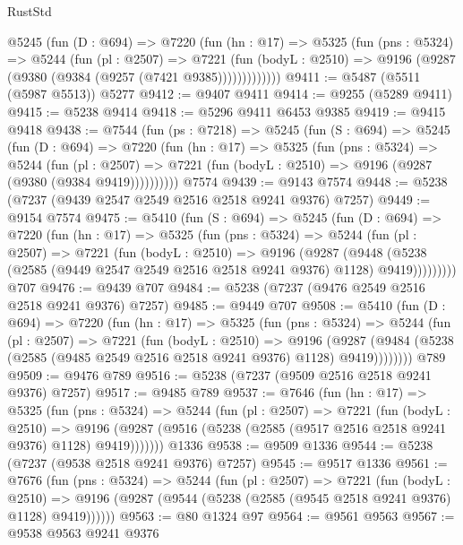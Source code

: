\begin{lexlean}{RustStd}
\begin{coremodule}
        @5245
          (fun (D : @694) =>
          @7220
            (fun (hn : @17) =>
            @5325
              (fun (pns : @5324) =>
              @5244
                (fun (pl : @2507) =>
                @7221
                  (fun (bodyL : @2510) =>
                  @9196 (@9287 (@9380 (@9384 (@9257 (@7421 @9385)))))))))))))
@9411 := @5487 (@5511 (@5987 @5513)) @5277
@9412 := @9407 @9411
@9414 := @9255 (@5289 @9411)
@9415 := @5238 @9414
@9418 := @5296 @9411 @6453 @9385
@9419 := @9415 @9418
@9438 := @7544
    (fun (ps : @7218) =>
    @5245
      (fun (S : @694) =>
      @5245
        (fun (D : @694) =>
        @7220
          (fun (hn : @17) =>
          @5325
            (fun (pns : @5324) =>
            @5244
              (fun (pl : @2507) =>
              @7221 (fun (bodyL : @2510) => @9196 (@9287 (@9380 (@9384 @9419))))))))))
    @7574
@9439 := @9143 @7574
@9448 := @5238 (@7237 (@9439 @2547 @2549 @2516 @2518 @9241 @9376) @7257)
@9449 := @9154 @7574
@9475 := @5410
    (fun (S : @694) =>
    @5245
      (fun (D : @694) =>
      @7220
        (fun (hn : @17) =>
        @5325
          (fun (pns : @5324) =>
          @5244
            (fun (pl : @2507) =>
            @7221
              (fun (bodyL : @2510) =>
              @9196
                (@9287
                  (@9448
                    (@5238 (@2585 (@9449 @2547 @2549 @2516 @2518 @9241 @9376) @1128) @9419)))))))))
    @707
@9476 := @9439 @707
@9484 := @5238 (@7237 (@9476 @2549 @2516 @2518 @9241 @9376) @7257)
@9485 := @9449 @707
@9508 := @5410
    (fun (D : @694) =>
    @7220
      (fun (hn : @17) =>
      @5325
        (fun (pns : @5324) =>
        @5244
          (fun (pl : @2507) =>
          @7221
            (fun (bodyL : @2510) =>
            @9196
              (@9287 (@9484 (@5238 (@2585 (@9485 @2549 @2516 @2518 @9241 @9376) @1128) @9419))))))))
    @789
@9509 := @9476 @789
@9516 := @5238 (@7237 (@9509 @2516 @2518 @9241 @9376) @7257)
@9517 := @9485 @789
@9537 := @7646
    (fun (hn : @17) =>
    @5325
      (fun (pns : @5324) =>
      @5244
        (fun (pl : @2507) =>
        @7221
          (fun (bodyL : @2510) =>
          @9196 (@9287 (@9516 (@5238 (@2585 (@9517 @2516 @2518 @9241 @9376) @1128) @9419)))))))
    @1336
@9538 := @9509 @1336
@9544 := @5238 (@7237 (@9538 @2518 @9241 @9376) @7257)
@9545 := @9517 @1336
@9561 := @7676
    (fun (pns : @5324) =>
    @5244
      (fun (pl : @2507) =>
      @7221
        (fun (bodyL : @2510) =>
        @9196 (@9287 (@9544 (@5238 (@2585 (@9545 @2518 @9241 @9376) @1128) @9419))))))
@9563 := @80 @1324 @97
@9564 := @9561 @9563
@9567 := @9538 @9563 @9241 @9376

\end{coremodule}
\end{lexlean}
